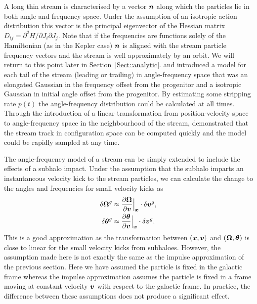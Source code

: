 \documentclass[useAMS,usenatbib,fleqn,a4paper]{mn2e}
\newcommand{\bs}[1]{\bmath{#1}}
\begin{document}
A long thin stream is characterised by a vector $\bs{n}$ along which the particles lie in both angle and frequency space. Under the assumption of an isotropic action distribution this vector is the principal eigenvector of the Hessian matrix $D_{ij}=\partial^2 H/\partial J_i\partial J_j$. Note that if the frequencies are functions solely of the Hamiltonian (as in the Kepler case) $\bs{n}$ is aligned with the stream particle frequency vectors and the stream is well approximately by an orbit. We will return to this point later in Section~\ref{Sect::analytic}. \cite{Bovy2014} and \cite{Sanders2014} introduced a model for each tail of the stream (leading or trailing) in angle-frequency space that was an elongated Gaussian in the frequency offset from the progenitor and a isotropic Gaussian in initial angle offset from the progenitor. By estimating some stripping rate $p(t)$ the angle-frequency distribution could be calculated at all times. Through the introduction of a linear transformation from position-velocity space to angle-frequency space in the neighbourhood of the stream, \cite{Bovy2014} demonstrated that the stream track in configuration space can be computed quickly and the model could be rapidly sampled at any time.

The angle-frequency model of a stream can be simply extended to include the effects of a subhalo impact. Under the assumption that the subhalo imparts an instantaneous velocity kick to the stream particles, we can calculate the change to the angles and frequencies for small velocity kicks as
\begin{equation}\label{eq:kickfreqangle}
\begin{split}
\delta \boldsymbol{\Omega}^g &\approx \frac{\upartial \boldsymbol{\Omega}}{\upartial \bs{v}}\Big|_{\bs{x}}\cdot \delta\bs{v}^g,\\
\delta \bs{\theta}^g &\approx \frac{\upartial \bs{\theta}}{\upartial \bs{v}}\Big|_{\bs{x}}\cdot \delta\bs{v}^g.
\end{split}
\end{equation}
This is a good approximation as the transformation between $(\bs{x},\bs{v})$ and $(\boldsymbol{\Omega},\bs{\theta})$ is close to linear for the small velocity kicks from subhaloes. However, the assumption made here is not exactly the same as the impulse approximation of the previous section. Here we have assumed the particle is fixed in the galactic frame whereas the impulse approximation assumes the particle is fixed in a frame moving at constant velocity $\bs{v}$ with respect to the galactic frame. In practice, the difference between these assumptions does not produce a significant effect.
\end{document}
